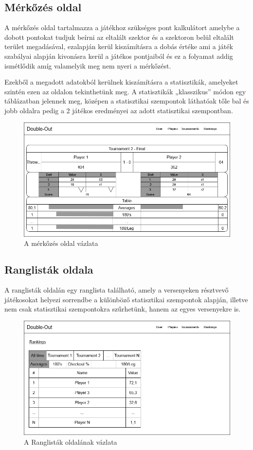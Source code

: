 \subsection{Mérkőzés oldal}
A mérkőzés oldal tartalmazza a játékhoz szükséges pont kalkulátort amelybe a dobott pontokat tudjuk beírni az eltalált szektor és a szektoron belül eltalált terület megadásával, ezalapján kerül kiszámításra a dobás értéke ami a játék szabályai alapján kivonásra kerül a játékos pontjaiból és ez a folyamat addig ismétlődik amíg valamelyik meg nem nyeri a mérkőzést.

Ezekből a megadott adatokból kerülnek kiszámításra a statisztikák, amelyeket szintén ezen az oldalon tekinthetünk meg. A statisztikák „klasszikus” módon egy táblázatban jelennek meg, középen a statisztikai szempontok láthatóak tőle bal és jobb oldalra pedig a 2 játékos eredményei az adott statisztikai szempontban.

\begin{figure}[h]
\centering
\includegraphics[scale=0.3]{images/MatchPage.drawio.png}
\caption{A mérkőzés oldal vázlata}
\label{fig:cimer}
\end{figure}

\subsection{Ranglisták oldala}
A ranglisták oldalán egy ranglista található, amely a versenyeken résztvevő játékosokat helyezi sorrendbe a különböző statisztikai szempontok alapján, illetve nem csak statisztikai szempontokra szűrhetünk, hanem az egyes versenyekre is.

\begin{figure}[h]
\centering
\includegraphics[scale=0.3]{images/Rankings.drawio.png}
\caption{A Ranglisták oldalának vázlata}
\label{fig:cimer}
\end{figure}

